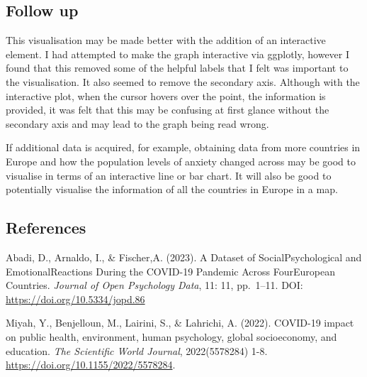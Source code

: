\documentclass[
]{article}
\begin{document}
\subsection{Follow up}\label{follow-up}

This visualisation may be made better with the addition of an
interactive element. I had attempted to make the graph interactive via
ggplotly, however I found that this removed some of the helpful labels
that I felt was important to the visualisation. It also seemed to remove
the secondary axis. Although with the interactive plot, when the cursor
hovers over the point, the information is provided, it was felt that
this may be confusing at first glance without the secondary axis and may
lead to the graph being read wrong.

If additional data is acquired, for example, obtaining data from more
countries in Europe and how the population levels of anxiety changed
across may be good to visualise in terms of an interactive line or bar
chart. It will also be good to potentially visualise the information of
all the countries in Europe in a map.

\subsection{References}\label{references}

Abadi, D., Arnaldo, I., \& Fischer,A. (2023). A Dataset of
SocialPsychological and EmotionalReactions During the COVID-19 Pandemic
Across FourEuropean Countries. \emph{Journal of Open Psychology Data},
11: 11, pp.~1--11. DOI: \url{https://doi.org/10.5334/jopd.86}

Miyah, Y., Benjelloun, M., Lairini, S., \& Lahrichi, A. (2022). COVID-19
impact on public health, environment, human psychology, global
socioeconomy, and education. \emph{The Scientific World Journal},
2022(5578284) 1-8. \url{https://doi.org/10.1155/2022/5578284}.
\end{document}

